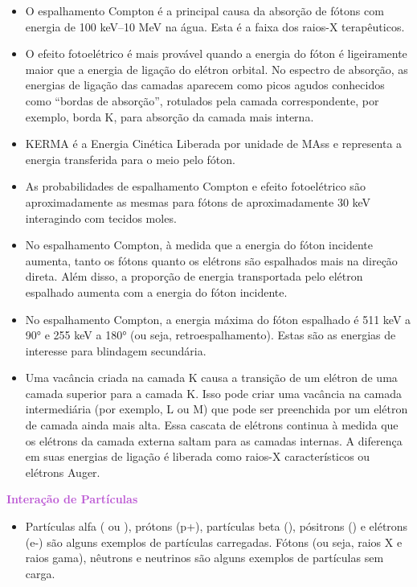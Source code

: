 \documentclass[11pt,a4paper]{article}
\newcounter{exemplo}
\begin{document}
\begin{exemplo}
\begin{itemize}
        \item O espalhamento Compton é a principal causa da absorção de fótons com energia de 100 keV–10 MeV na água. Esta é a faixa dos raios-X terapêuticos.
        
        \item O efeito fotoelétrico é mais provável quando a energia do fóton é ligeiramente maior que a energia de ligação do elétron orbital. No espectro de absorção, as energias de ligação das camadas aparecem como picos agudos conhecidos como “bordas de absorção”, rotulados pela camada correspondente, por exemplo, borda K, para absorção da camada mais interna.
        
        \item KERMA é a Energia Cinética Liberada por unidade de MAss e representa a energia transferida para o meio pelo fóton.
        
        \item As probabilidades de espalhamento Compton e efeito fotoelétrico são aproximadamente as mesmas para fótons de aproximadamente 30 keV interagindo com tecidos moles.
        
        \item No espalhamento Compton, à medida que a energia do fóton incidente aumenta, tanto os fótons quanto os elétrons são espalhados mais na direção direta. Além disso, a proporção de energia transportada pelo elétron espalhado aumenta com a energia do fóton incidente.
        
        \item No espalhamento Compton, a energia máxima do fóton espalhado é 511 keV a 90° e 255 keV a 180° (ou seja, retroespalhamento). Estas são as energias de interesse para blindagem secundária.
        
        \item Uma vacância criada na camada K causa a transição de um elétron de uma camada superior para a camada K. Isso pode criar uma vacância na camada intermediária (por exemplo, L ou M) que pode ser preenchida por um elétron de camada ainda mais alta. Essa cascata de elétrons continua à medida que os elétrons da camada externa saltam para as camadas internas. A diferença em suas energias de ligação é liberada como raios-X característicos ou elétrons Auger.
    \end{itemize}

    \textcolor{MediumOrchid}{\LobsterTwo\textbf{Interação de Partículas}}
    \begin{itemize}
        \item Partículas alfa ( ou ), prótons (p+), partículas beta (\ce{\beta-}), pósitrons (\ce{\beta+}) e elétrons (e-) são alguns exemplos de partículas carregadas. Fótons (ou seja, raios X e raios gama), nêutrons e neutrinos são alguns exemplos de partículas sem carga.
        

\end{itemize}
\end{exemplo}
\end{document}
